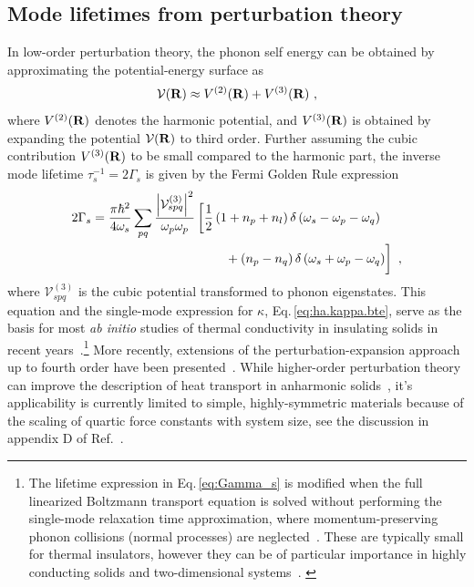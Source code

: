 \subsection{Mode lifetimes from perturbation theory}
In low-order perturbation theory, the phonon self energy can be obtained by approximating the potential-energy surface as
%
\begin{align}
	\mathcal{V} (\b R) \approx V^{(2)} (\b R) + V^{(3)} (\b R)~,
	\label{eq:V3}
\end{align}
%
where $V^{(2)} ({\bf R})$ denotes the harmonic potential, and $V^{(3)} ({\bf R})$ is obtained by expanding the potential $\mathcal V ({\bf R})$ to third order. Further assuming the cubic contribution $V^{(3)} ({\bf R})$ to be small compared to the harmonic part, the inverse mode lifetime $\tau_s^{-1} = 2 \Gamma_s$ is given by the Fermi Golden Rule expression~\cite{Maradudin1962,Cowley.1963}
%
\begin{align}
\begin{split}
	2 \Gamma_{s}=\frac{\pi \hbar^{2}}{4 \omega_{s}} \sum_{pq} \frac{\left|\mathcal V^{(3)}_{spq}\right|^{2}}{\omega_{p} \omega_{p}}
		&\left[ 
	  \frac{1}{2}\left(1+n_{p}+n_{l}\right) \delta\left(\omega_{s}-\omega_{p}-\omega_{q}\right) \right. \\
		&\left.~~~~ \phantom{\halb} + \left(n_{p}-n_{q}\right) \delta\left(\omega_{s}+\omega_{p}-\omega_{q}\right)\right]~,
\end{split}
\label{eq:Gamma_s}
\end{align}
%
where $\mathcal V^{(3)}_{spq}$ is the cubic potential transformed to phonon eigenstates. This equation and the single-mode expression for $\kappa$, Eq.\,\eqref{eq:ha.kappa.bte}, serve as the basis for most \emph{ab initio} studies of thermal conductivity in insulating solids in recent years~\cite{Broido2007,Simoncelli2019,Isaeva2019}.\footnote{The lifetime expression in Eq.\,\eqref{eq:Gamma_s} is modified when the full linearized Boltzmann transport equation is solved without performing the single-mode relaxation time approximation, where momentum-preserving phonon collisions (normal processes) are neglected~\cite{Klemens.1958,Omini.1996,Omini.1997,Broido.2005}. These are typically small for thermal insulators, however they can be of particular importance in highly conducting solids and two-dimensional systems~\cite{Lindsay.2010,Fugallo.2014,Cepellotti.2016}. \label{foot:SMRTA}} 
More recently, extensions of the perturbation-expansion approach up to fourth order have been presented~\cite{Feng2016,Feng2017,Ravichandran2018,Xia2018}. While higher-order perturbation theory can improve the description of heat transport in anharmonic solids~\cite{Xia2020,Ravichandran2020}, it's applicability is currently limited to simple, highly-symmetric materials because of the scaling of quartic force constants with system size, see the discussion in appendix D of Ref.~\cite{Ravichandran2018}.


